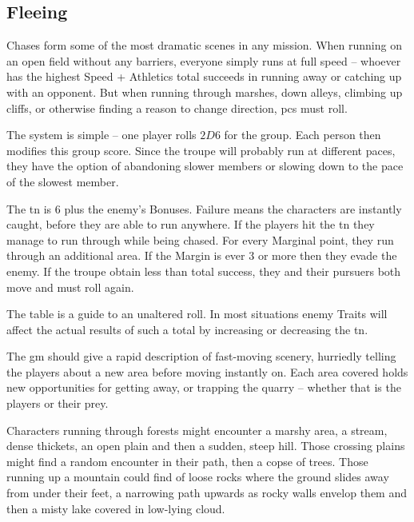 \begin{multicols}{2}

\subsection{Fleeing}

Chases form some of the most dramatic scenes in any mission.
When running on an open field without any barriers, everyone simply runs at full speed -- whoever has the highest Speed + Athletics total succeeds in running away or catching up with an opponent.
But when running through marshes, down alleys, climbing up cliffs, or otherwise finding a reason to change direction, \glspl{pc} must roll.

The system is simple -- one player rolls $2D6$ for the group.
Each person then modifies this group score.
Since the troupe will probably run at different paces, they have the option of abandoning slower members or slowing down to the pace of the slowest member.

The \gls{tn} is 6 plus the enemy's  Bonuses.
Failure means the characters are instantly caught, before they are able to run anywhere.
If the players hit the \gls{tn} they manage to run through  while being chased.
For every Marginal point, they run through an additional \gls{area}.
If the Margin is ever 3 or more then they evade the enemy.
If the troupe obtain less than total success, they and their pursuers both move and must roll again.

The table is a guide to an unaltered roll. In most situations enemy Traits will affect the actual results of such a total by increasing or decreasing the \gls{tn}.

The \gls{gm} should give a rapid description of fast-moving scenery, hurriedly telling the players about a new \gls{area} before moving instantly on.
Each \gls{area} covered holds new opportunities for getting away, or trapping the quarry -- whether that is the players or their prey.

Characters running through forests might encounter a marshy area, a stream, dense thickets, an open plain and then a sudden, steep hill.
Those crossing plains might find a random encounter in their path, then a copse of trees.
Those running up a mountain could find  of loose rocks where the ground slides away from under their feet, a narrowing path upwards as rocky walls envelop them and then a misty lake covered in low-lying cloud.


\end{multicols}
